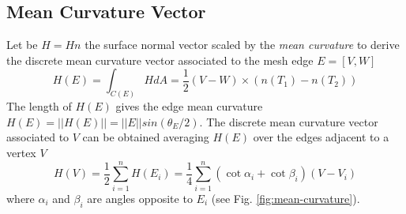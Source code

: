 
\subsection{Mean Curvature Vector}
Let be $H = H n$ the surface normal vector scaled by the \textit{mean curvature} to derive the discrete mean curvature vector associated to the mesh edge $E=[V, W]$
$$ H(E) = \int_{C(E)} HdA = \frac{1}{2} (V-W) \times (n(T_1) - n(T_2))$$
The length of $H(E)$ gives the edge mean curvature $H(E) = ||H(E) || = ||E|| sin(\theta_E/2)$. The discrete mean curvature vector associated to $V$ can be obtained averaging $H(E)$ over the edges adjacent to a vertex $V$
$$H(V) = \frac{1}{2} \sum_{i=1}^{n} H(E_i) = \frac{1}{4}\sum_{i=1}^n (\cot \alpha_i + \cot \beta_i)(V - V_i)$$
where $\alpha_i$ and $\beta_i$ are angles opposite to $E_i$ (see Fig. \ref{fig:mean-curvature}).
\cite{geometryprocessing}
